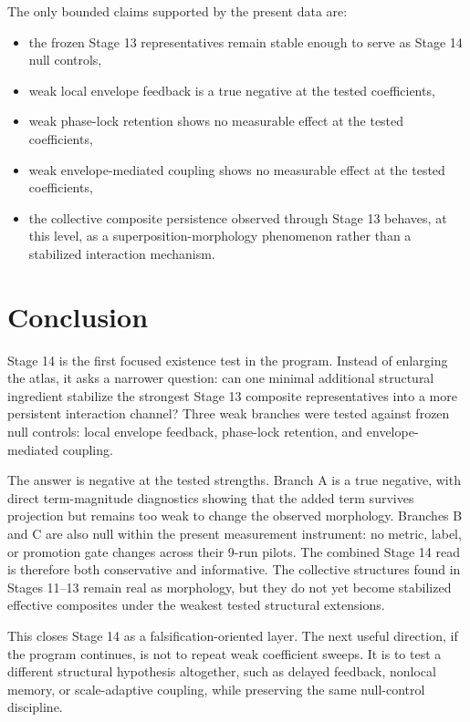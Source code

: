 \documentclass[11pt]{article}
\begin{document}
The only bounded claims supported by the present data are:
\begin{itemize}
\item the frozen Stage 13 representatives remain stable enough to serve as Stage 14 null controls,
\item weak local envelope feedback is a true negative at the tested coefficients,
\item weak phase-lock retention shows no measurable effect at the tested coefficients,
\item weak envelope-mediated coupling shows no measurable effect at the tested coefficients,
\item the collective composite persistence observed through Stage 13 behaves, at this level, as a superposition-morphology phenomenon rather than a stabilized interaction mechanism.
\end{itemize}

\section{Conclusion}

Stage 14 is the first focused existence test in the program. Instead of enlarging the atlas, it asks a narrower question: can one minimal additional structural ingredient stabilize the strongest Stage 13 composite representatives into a more persistent interaction channel? Three weak branches were tested against frozen null controls: local envelope feedback, phase-lock retention, and envelope-mediated coupling.

The answer is negative at the tested strengths. Branch A is a true negative, with direct term-magnitude diagnostics showing that the added term survives projection but remains too weak to change the observed morphology. Branches B and C are also null within the present measurement instrument: no metric, label, or promotion gate changes across their 9-run pilots. The combined Stage 14 read is therefore both conservative and informative. The collective structures found in Stages 11--13 remain real as morphology, but they do not yet become stabilized effective composites under the weakest tested structural extensions.

This closes Stage 14 as a falsification-oriented layer. The next useful direction, if the program continues, is not to repeat weak coefficient sweeps. It is to test a different structural hypothesis altogether, such as delayed feedback, nonlocal memory, or scale-adaptive coupling, while preserving the same null-control discipline.
\end{document}
